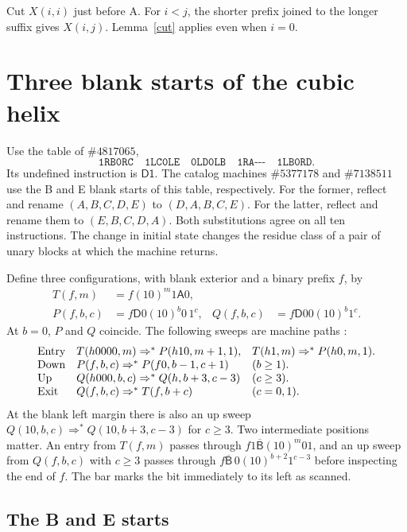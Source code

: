 \documentclass[11pt]{article}
\newcommand{\state}[1]{\mathsf{#1}}
\newcommand{\run}{\mathrel{\Rightarrow^{*}}}
\newcommand{\Bleft}{\overline{\state B}}
\newcommand{\word}[1]{\texttt{#1}}
\begin{document}
Cut \(X(i,i)\) just before A. For \(i<j\), the shorter prefix joined to the longer suffix gives \(X(i,j)\). Lemma~\ref{cut} applies even when \(i=0\).

\section{Three blank starts of the cubic helix}

Use the table of \(\#4817065\),
\[
\word{1RB0RC}\quad\word{1LC0LE}\quad\word{0LD0LB}\quad
\word{1RA-{}-{}-}\quad\word{1LB0RD}.
\]
Its undefined instruction is \(\state{D1}\). The catalog machines \(\#5377178\) and \(\#7138511\) use the B and E blank starts of this table, respectively. For the former, reflect and rename \((A,B,C,D,E)\) to \((D,A,B,C,E)\). For the latter, reflect and rename them to \((E,B,C,D,A)\). Both substitutions agree on all ten instructions. The change in initial state changes the residue class of a pair of unary blocks at which the machine returns.

Define three configurations, with blank exterior and a binary prefix \(f\), by
\begin{align*}
 T(f,m)&=f(10)^m1\state A0,\\
 P(f,b,c)&=f\state D0(10)^b0\,1^c,&
 Q(f,b,c)&=f\state D00(10)^b1^c .
\end{align*}
At \(b=0\), \(P\) and \(Q\) coincide. The following sweeps are machine paths \cite[Lemma~2]{prior}:
\[
\begin{array}{@{}lll@{}}
\text{Entry}&T(h0000,m)\run P(h10,m+1,1),&
 T(h1,m)\run P(h0,m,1).\\
\text{Down}&P(f,b,c)\run P(f0,b-1,c+1)&(b\ge1).\\
\text{Up}&Q(h000,b,c)\run Q(h,b+3,c-3)&(c\ge3).\\
\text{Exit}&Q(f,b,c)\run T(f,b+c)&(c=0,1).
\end{array}
\]
At the blank left margin there is also an up sweep \(Q(10,b,c)\run Q(10,b+3,c-3)\) for \(c\ge3\). Two intermediate positions matter. An entry from \(T(f,m)\) passes through \(f1\Bleft(10)^m01\), and an up sweep from \(Q(f,b,c)\) with \(c\ge3\) passes through \(f\Bleft\,0(10)^{b+2}1^{c-3}\) before inspecting the end of \(f\). The bar marks the bit immediately to its left as scanned.

\subsection{The B and E starts}
\end{document}
